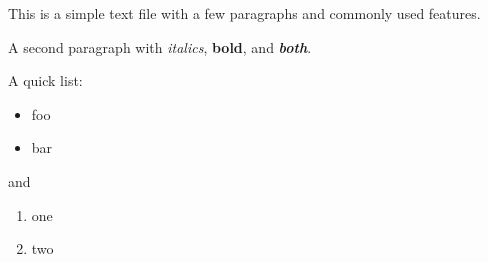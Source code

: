 This is a simple text file with a few paragraphs and
commonly used features.

A second paragraph with \emph{italics}, \textbf{bold}, and \textbf{\emph{both}}.

A quick list:

\begin{itemize}
\item foo
\item bar
\end{itemize}

and

\begin{enumerate}
\item one
\item two
\end{enumerate}
